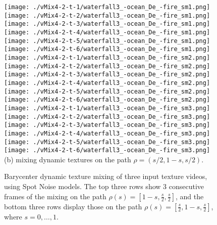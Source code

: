 \begin{figure}[ht!]
{\vspace{1mm}
    \texttt{[image: ./vMix4-2-t-1/waterfall3\_-ocean\_De\_-fire\_sm1.png]}
    \texttt{[image: ./vMix4-2-t-2/waterfall3\_-ocean\_De\_-fire\_sm1.png]}
    \texttt{[image: ./vMix4-2-t-3/waterfall3\_-ocean\_De\_-fire\_sm1.png]}
    \texttt{[image: ./vMix4-2-t-4/waterfall3\_-ocean\_De\_-fire\_sm1.png]}
    \texttt{[image: ./vMix4-2-t-5/waterfall3\_-ocean\_De\_-fire\_sm1.png]}
    \texttt{[image: ./vMix4-2-t-6/waterfall3\_-ocean\_De\_-fire\_sm1.png]}\\
\vspace{1mm}
    \texttt{[image: ./vMix4-2-t-1/waterfall3\_-ocean\_De\_-fire\_sm2.png]}
    \texttt{[image: ./vMix4-2-t-2/waterfall3\_-ocean\_De\_-fire\_sm2.png]}
    \texttt{[image: ./vMix4-2-t-3/waterfall3\_-ocean\_De\_-fire\_sm2.png]}
    \texttt{[image: ./vMix4-2-t-4/waterfall3\_-ocean\_De\_-fire\_sm2.png]}
    \texttt{[image: ./vMix4-2-t-5/waterfall3\_-ocean\_De\_-fire\_sm2.png]}
    \texttt{[image: ./vMix4-2-t-6/waterfall3\_-ocean\_De\_-fire\_sm2.png]}\\
\vspace{1mm}
    \texttt{[image: ./vMix4-2-t-1/waterfall3\_-ocean\_De\_-fire\_sm3.png]}
    \texttt{[image: ./vMix4-2-t-2/waterfall3\_-ocean\_De\_-fire\_sm3.png]}
    \texttt{[image: ./vMix4-2-t-3/waterfall3\_-ocean\_De\_-fire\_sm3.png]}
    \texttt{[image: ./vMix4-2-t-4/waterfall3\_-ocean\_De\_-fire\_sm3.png]}
    \texttt{[image: ./vMix4-2-t-5/waterfall3\_-ocean\_De\_-fire\_sm3.png]}
    \texttt{[image: ./vMix4-2-t-6/waterfall3\_-ocean\_De\_-fire\_sm3.png]}\\
(b) mixing dynamic textures on the path $\rho =(s/2, 1-s, s/2)$.\\
}
\caption{Barycenter dynamic texture mixing of three input texture videos, using Spot Noise models. The top three rows show 3 consecutive frames of the mixing on the path $\rho(s) = [1-s, \frac{s}{2}, \frac{s}{2}]$, and the bottom three rows display those on the path $\rho(s) = [\frac{s}{2}, 1-s, \frac{s}{2}]$, where $s = 0, \dots, 1$.
}
\label{fig:dynamic-barycenter-sn}
\end{figure}
\fi


